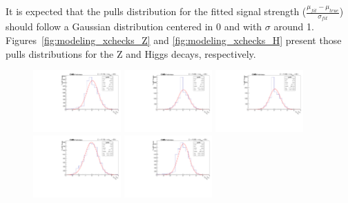 







It is expected that the pulls distribution for the fitted signal strength ($\frac{\mu_{fit} - \mu_{true}}{\sigma_{fit}}$) should follow a Gaussian distribution centered in 0 and with $\sigma$ around 1. Figures~\ref{fig:modeling_xchecks_Z} and \ref{fig:modeling_xchecks_H} present those pulls distributions for the Z and Higgs decays, respectively.






\begin{figure}[!htbp]
\begin{center}
 \includegraphics[width=0.3\textwidth]{figures_and_tables/modeling_xchecks/plots/ZToUpsilon1SPhoton_Cat0_signalStrenght_20/pulls}
\includegraphics[width=0.3\textwidth]{figures_and_tables/modeling_xchecks/plots/ZToUpsilon2SPhoton_Cat0_signalStrenght_20/pulls}
\includegraphics[width=0.3\textwidth]{figures_and_tables/modeling_xchecks/plots/ZToUpsilon3SPhoton_Cat0_signalStrenght_20/pulls}
\includegraphics[width=0.3\textwidth]{figures_and_tables/modeling_xchecks/plots/ZToUpsilon1SPhoton_Cat0_signalStrenght_50/pulls}
\includegraphics[width=0.3\textwidth]{figures_and_tables/modeling_xchecks/plots/ZToUpsilon2SPhoton_Cat0_signalStrenght_50/pulls}

\end{center}
\end{figure}
